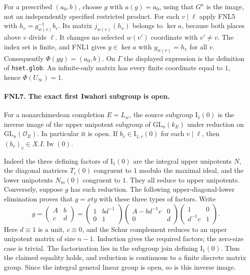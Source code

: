 For a prescribed \((a_0,b)\), choose \(g\) with \(a(g)=a_0\), using
that \(G^a\) is the image, not an independently specified restricted
product.  For each \(v\mid\ell\) apply FNL5 with
\(h_v=g_{w(v)}^{-1}b_v\).  Its matrix \(j_{w(v)}(h_v)\) belongs to
\(\ker a\), because both places above \(v\) divide \(\ell\).
It changes no selected \(w(v')\) coordinate with \(v'\ne v\).
The index set is finite, and FNL1 gives \(y\in\ker a\) with
\(y_{w(v)}=h_v\) for all \(v\).  Consequently \(\Phi(gy)=(a_0,b)\).
On \(\Gamma\) the displayed expression is the definition of
\texttt{hset.glob}.  An infinite-only matrix has every finite
coordinate equal to \(1\), hence \(\Phi(U_\infty)=1\).

\paragraph{FNL7. The exact first Iwahori subgroup is open.}
\label{claim:FNL7}
For a nonarchimedean completion \(E=L_w\), the source subgroup
\(\mathrm{I}_1(0)\) is the inverse image of the upper unipotent
subgroup of \(\mathrm{GL}_n(k_E)\) under reduction on
\(\mathrm{GL}_n(\mathcal O_E)\).  In particular it is open.  If
\(b_v\in\mathrm{I}_{1,v}(0)\) for each \(v\mid\ell\), then
\((b_v)_v\in X.I.\operatorname{Iw}(0)\).

Indeed the three defining factors of \(\mathrm{I}_1(0)\) are the
integral upper unipotents \(N\), the diagonal matrices
\(T_c(0)\) congruent to \(1\) modulo the maximal ideal, and the
lower unipotents \(N_m(0)\) congruent to \(1\).  They all reduce
to upper unipotents.  Conversely, suppose \(g\) has such reduction.
The following upper-diagonal-lower elimination proves that
\(g=x t y\) with these three types of factors.  Write
\[
 g=\begin{pmatrix}A&b\\c&d\end{pmatrix}
 =\begin{pmatrix}1&bd^{-1}\\0&1\end{pmatrix}
  \begin{pmatrix}A-bd^{-1}c&0\\0&d\end{pmatrix}
  \begin{pmatrix}1&0\\d^{-1}c&1\end{pmatrix}.
\]
Here \(d\equiv1\) is a unit, \(c\equiv0\), and the Schur
complement reduces to an upper unipotent matrix of size \(n-1\).
Induction gives the required factors; the zero-size case is trivial.
The factorization lies in the subgroup join defining \(\mathrm I_1(0)\).
Thus the claimed equality holds, and reduction is continuous to a
finite discrete matrix group.  Since the integral general linear
group is open, so is this inverse image.

